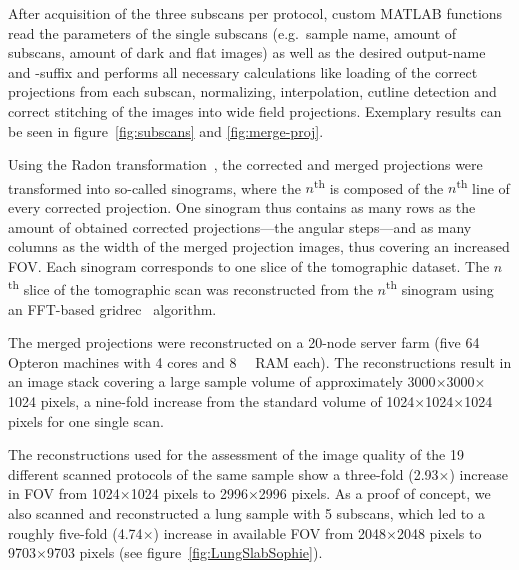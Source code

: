 After acquisition of the three subscans per protocol, custom MATLAB functions read the parameters of the single subscans (e.g.\ sample name, amount of subscans, amount of dark and flat images) as well as the desired output-name and -suffix and performs all necessary calculations like loading of the correct projections from each subscan, normalizing, interpolation, cutline detection and correct stitching of the images into wide field projections. Exemplary results can be seen in figure~\ref{fig:subscans} and \ref{fig:merge-proj}. 

\cbstart
Using the Radon transformation~\cite{Radon1917}, the corrected and merged projections were transformed into so-called sinograms, where the $n$\textsuperscript{th} is composed of the $n$\textsuperscript{th} line of every corrected projection. One sinogram thus contains as many rows as the amount of obtained corrected projections---the angular steps---and as many columns as the width of the merged projection images, thus covering an increased FOV. Each sinogram corresponds to one slice of the tomographic dataset. The $n$\textsuperscript{th} slice of the tomographic scan was reconstructed from the $n$\textsuperscript{th} sinogram using an FFT-based gridrec~\cite{Dowd1999} algorithm.

The merged projections were reconstructed on a 20-node server farm (five \SI{64}{\bit} Opteron machines with 4 cores and \SI{8}{\giga\byte} RAM each). The reconstructions result in an image stack covering a large sample volume of approximately 3000$\times$3000$\times$1024 pixels, a nine-fold increase from the standard volume of 1024$\times$1024$\times$1024 pixels for one single scan.
\cbend

The reconstructions used for the assessment of the image quality of the 19 different scanned protocols of the same sample show a three-fold (2.93\(\times\)) increase in FOV from 1024\(\times\)1024 pixels to 2996\(\times\)2996 pixels. As a proof of concept, we also scanned and reconstructed a lung sample with 5 subscans, which led to a roughly five-fold (4.74\(\times\)) increase in available FOV from 2048\(\times\)2048 pixels to 9703\(\times\)9703 pixels (see figure~\ref{fig:LungSlabSophie}).
